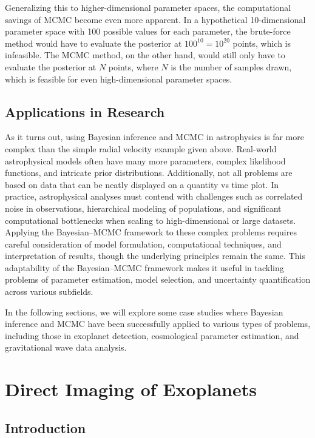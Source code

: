 \documentclass[preprint,longauthor]{aastex631}
\numberwithin{equation}{section}
\begin{document}
Generalizing this to higher-dimensional parameter spaces, the computational savings of MCMC become even more apparent. In a hypothetical 10-dimensional parameter space with 100 possible values for each parameter, the brute-force method would have to evaluate the posterior at $100^{10} = 10^{20}$ points, which is infeasible. The MCMC method, on the other hand, would still only have to evaluate the posterior at $N$ points, where $N$ is the number of samples drawn, which is feasible for even high-dimensional parameter spaces.

\subsection{Applications in Research}

As it turns out, using Bayesian inference and MCMC in astrophysics is far more complex than the simple radial velocity example given above. Real-world astrophysical models often have many more parameters, complex likelihood functions, and intricate prior distributions. Additionally, not all problems are based on data that can be neatly displayed on a quantity vs time plot. In practice, astrophysical analyses must contend with challenges such as correlated noise in observations, hierarchical modeling of populations, and significant computational bottlenecks when scaling to high-dimensional or large datasets. Applying the Bayesian–MCMC framework to these complex problems requires careful consideration of model formulation, computational techniques, and interpretation of results, though the underlying principles remain the same. This adaptability of the Bayesian–MCMC framework makes it useful in tackling problems of parameter estimation, model selection, and uncertainty quantification across various subfields.

In the following sections, we will explore some case studies where Bayesian inference and MCMC have been successfully applied to various types of problems, including those in exoplanet detection, cosmological parameter estimation, and gravitational wave data analysis.

\section{Direct Imaging of Exoplanets}
\label{sec:CaseStudies}

\subsection{Introduction}
\end{document}
